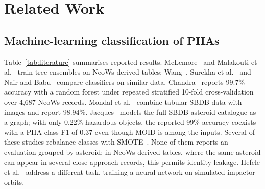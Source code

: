 \documentclass[conference]{IEEEtran}
\begin{document}
\section{Related Work}

\subsection{Machine-learning classification of PHAs}
Table~\ref{tab:literature} summarises reported results. McLemore~\cite{mclemore2022} and Malakouti et al.~\cite{malakouti2023} train tree ensembles on NeoWs-derived tables; Wang~\cite{wang2023}, Surekha et al.~\cite{surekha2024} and Nair and Babu~\cite{nair2025} compare classifiers on similar data. Chandra~\cite{chandra2025} reports 99.7\% accuracy with a random forest under repeated stratified 10-fold cross-validation over 4,687 NeoWs records. Mondal et al.~\cite{mondal2025} combine tabular SBDB data with images and report 98.94\%. Jacques~\cite{jacques2025} models the full SBDB asteroid catalogue as a graph; with only 0.22\% hazardous objects, the reported 99\% accuracy coexists with a PHA-class F1 of 0.37 even though MOID is among the inputs. Several of these studies rebalance classes with SMOTE~\cite{chawla2002}. None of them reports an evaluation grouped by asteroid; in NeoWs-derived tables, where the same asteroid can appear in several close-approach records, this permits identity leakage. Hefele et al.~\cite{hefele2020} address a different task, training a neural network on simulated impactor orbits.
\end{document}
